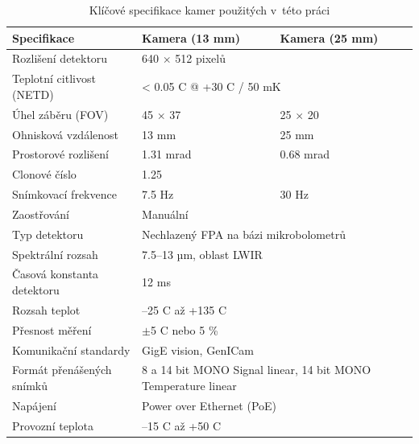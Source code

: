   \begin{table}[h]
    \centering
    \begin{tabular}{|m{5cm}|m{3.5cm}|m{3.5cm}|} \hline
      \rowcolor{Blue} \hline
      \color{White}\textbf{Specifikace} & \color{White}\textbf{Kamera (13 mm)} & \color{White}\textbf{Kamera (25 mm)} \\ \hline
      Rozlišení detektoru & \multicolumn{2}{|m{7cm}|}{ 640 $\times$ 512 pixelů } \\ \hline
      Teplotní citlivost (NETD)& \multicolumn{2}{|m{7cm}|}{< 0.05 \textdegree{}C @ +30 \textdegree{}C / 50 mK} \\ \hline
      Úhel záběru (FOV) & 45\textdegree{} $\times$ 37\textdegree{} &  25\textdegree{} $\times$  20\textdegree{} \\ \hline
      Ohnisková vzdálenost & 13 mm & 25 mm \\ \hline
      Prostorové rozlišení & 1.31 mrad & 0.68 mrad \\ \hline
      Clonové číslo & \multicolumn{2}{|m{7cm}|}{1.25} \\ \hline
      Snímkovací frekvence & 7.5 Hz & 30 Hz\\ \hline
      Zaostřování & \multicolumn{2}{|m{7cm}|}{Manuální} \\ \hline 
      Typ detektoru & \multicolumn{2}{|m{7cm}|}{Nechlazený FPA na bázi mikrobolometrů} \\ \hline
      Spektrální rozsah & \multicolumn{2}{|m{7cm}|}{7.5–13 µm, oblast LWIR} \\ \hline
      Časová konstanta detektoru & \multicolumn{2}{|m{7cm}|}{12 ms} \\ \hline
      Rozsah teplot & \multicolumn{2}{|m{7cm}|}{–25 \textdegree{}C až +135 \textdegree{}C} \\ \hline
      Přesnost měření & \multicolumn{2}{|m{7cm}|}{ $\pm$5 \textdegree{}C nebo 5 \%} \\ \hline
      Komunikační standardy & \multicolumn{2}{|m{7cm}|}{GigE vision, GenICam} \\ \hline
      Formát přenášených snímků & \multicolumn{2}{|m{7cm}|}{ 8 a 14 bit MONO Signal linear, 14 bit MONO Temperature linear} \\ \hline
      Napájení & \multicolumn{2}{|m{7cm}|}{Power over Ethernet (PoE) } \\ \hline
      Provozní teplota & \multicolumn{2}{|m{7cm}|}{–15 \textdegree{}C až +50 \textdegree{}C} \\ \hline
    \end{tabular}
    \caption{Klíčové specifikace kamer použitých v~této práci}
    \label{table:flir_a65_spec}
  \end{table}

